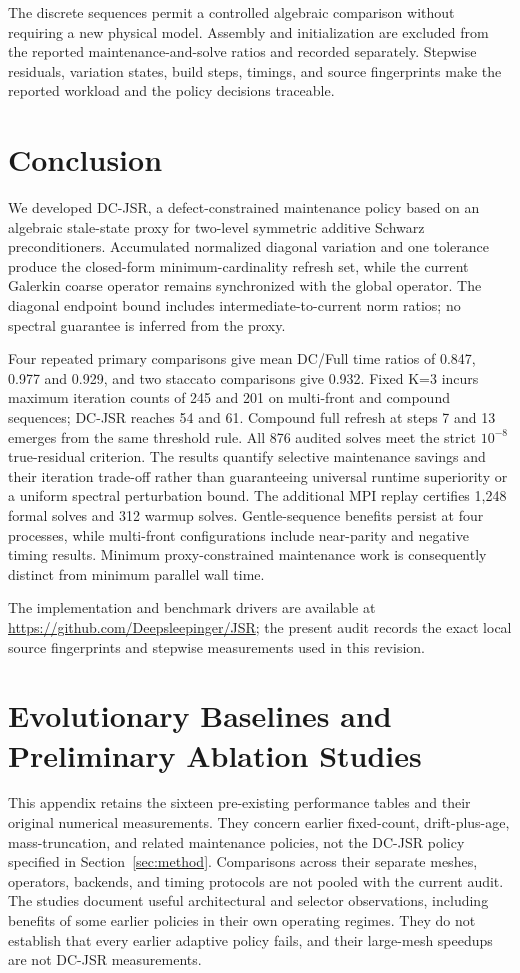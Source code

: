 \documentclass[preprint,12pt,3p]{elsarticle}
\begin{document}
The discrete sequences permit a controlled algebraic comparison without
requiring a new physical model. Assembly and initialization are excluded
from the reported maintenance-and-solve ratios and recorded separately.
Stepwise residuals, variation states, build steps, timings, and source
fingerprints make the reported workload and the policy decisions traceable.

\section{Conclusion}
\label{sec:conclusion}
We developed DC-JSR, a defect-constrained maintenance policy based on an
algebraic stale-state proxy for two-level symmetric additive Schwarz
preconditioners. Accumulated normalized diagonal variation and one tolerance
produce the closed-form minimum-cardinality refresh set, while the current
Galerkin coarse operator remains synchronized with the global operator.
The diagonal endpoint bound includes intermediate-to-current norm ratios;
no spectral guarantee is inferred from the proxy.

Four repeated primary comparisons give mean DC/Full time ratios of 0.847,
0.977 and 0.929, and two staccato comparisons give 0.932. Fixed K=3 incurs
maximum iteration counts of 245 and 201 on multi-front and compound sequences;
DC-JSR reaches 54 and 61. Compound full refresh at steps 7 and 13 emerges
from the same threshold rule. All 876 audited solves meet the strict
$10^{-8}$ true-residual criterion. The results quantify selective maintenance
savings and their iteration trade-off rather than guaranteeing universal
runtime superiority or a uniform spectral perturbation bound. The additional
MPI replay certifies 1,248 formal solves and 312 warmup solves. Gentle-sequence
benefits persist at four processes, while multi-front configurations include
near-parity and negative timing results. Minimum proxy-constrained maintenance
work is consequently distinct from minimum parallel wall time.

The implementation and benchmark drivers are available at
\url{https://github.com/Deepsleepinger/JSR}; the present audit records the exact
local source fingerprints and stepwise measurements used in this revision.


\clearpage
\appendix
\section{Evolutionary Baselines and Preliminary Ablation Studies}
\label{sec:evolutionary_baselines}
\label{subsec:historical_jsr_context}
This appendix retains the sixteen pre-existing performance tables and their
original numerical measurements. They concern earlier fixed-count,
drift-plus-age, mass-truncation, and related maintenance policies, not the
DC-JSR policy specified in Section~\ref{sec:method}. Comparisons across their
separate meshes, operators, backends, and timing protocols are not pooled
with the current audit. The studies document useful architectural and
selector observations, including benefits of some earlier policies in their
own operating regimes. They do not establish that every earlier adaptive
policy fails, and their large-mesh speedups are not DC-JSR measurements.
\end{document}
